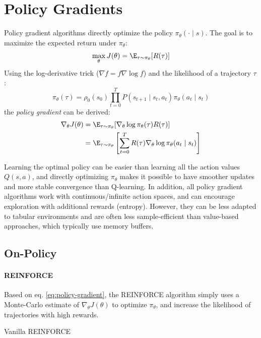 \section{Policy Gradients}
Policy gradient algorithms directly optimize the policy $\pi_\theta(\cdot \mid  s)$. The goal is to maximize the expected return under $\pi_\theta$:
\[
    \max_\theta J(\theta) = \E_{\tau \sim \pi_\theta} [R(\tau)]
\]
Using the log-derivative trick ($\nabla f = f \nabla \log f$) and the likelihood of a trajectory $\tau$:
\[
    \pi_\theta(\tau) = \rho_0(s_0) \prod_{t=0}^T P(s_{t+1} \mid  s_t, a_t) \pi_\theta(a_t \mid  s_t)
\]
the \emph{policy gradient} can be derived:
\begin{align}
    \nabla_\theta J(\theta) 
    &= \E_{\tau \sim \pi_\theta} [\nabla_\theta \log \pi_\theta(\tau) R(\tau)] \nonumber \\
    &= \E_{\tau \sim \pi_\theta} \left[\sum_{t=0}^T R(\tau) \nabla_\theta \log \pi_\theta(a_t \mid  s_t) \right]
    \label{eq:policy-gradient}
\end{align}


Learning the optimal policy can be easier than learning all the action values $Q(s,a)$, and directly optimizing $\pi_\theta$ makes it possible to have smoother updates and more stable convergence than Q-learning. In addition, all policy gradient algorithms work with continuous/infinite action spaces, and can encourage exploration with additional rewards (entropy). However, they can be less adapted to tabular environments and are often less sample-efficient than value-based approaches, which typically use memory buffers.

\subsection{On-Policy}
\paragraph{REINFORCE}
Based on eq. \ref{eq:policy-gradient}, the REINFORCE algorithm simply uses a Monte-Carlo estimate of $\nabla_\theta J(\theta)$ to optimize $\pi_\theta$, and increase the likelihood of trajectories with high rewards.

\begin{algorithm}[H]
\DontPrintSemicolon
{}
\caption{Vanilla REINFORCE}
\label{algo:reinforce}
\end{algorithm}

